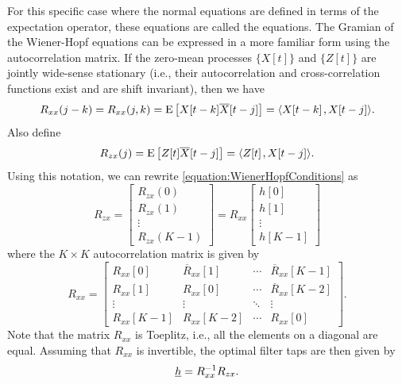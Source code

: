 For this specific case where the normal equations are defined in terms of the expectation operator, these equations are called the  equations.
The Gramian of the Wiener-Hopf equations can be expressed in a more familiar form using the autocorrelation matrix.
If the zero-mean processes $\{X[t]\}$ and $\{Z[t]\}$ are jointly wide-sense stationary (i.e., their autocorrelation and cross-correlation functions exist and are shift invariant), then we have
\begin{equation*}
R_{xx} (j-k) = R_{xx} (j, k) = \mathrm{E} \left[ X[t-k] \overline{X}[t-j] \right]
= {\left\langle  X[t-k]  \mskip2mu ,  X[t-j]  \right\rangle} .
\end{equation*}
Also define
\begin{equation*}
R_{zx}(j) = \mathrm{E} \left[ Z[t] \overline{X}[t-j] \right]
= {\left\langle  Z[t]  \mskip2mu ,  X[t-j]  \right\rangle} .
\end{equation*}
Using this notation, we can rewrite \eqref{equation:WienerHopfConditions} as
\begin{equation*}
R_{zx} = \begin{bmatrix}
R_{zx} (0) \\ R_{zx} (1) \\ \vdots \\ R_{zx} (K-1) \end{bmatrix}
= R_{xx}
\begin{bmatrix}
h [0] \\
h [1] \\ \vdots \\
h [K-1] \end{bmatrix}
\end{equation*}
where the $K \times K$ autocorrelation matrix is given by
\begin{equation*}
R_{xx} = \begin{bmatrix}
R_{xx} [0] & \overline{R}_{xx}[1] & \cdots & \overline{R}_{xx}[K-1] \\
R_{xx} [1] & R_{xx}[0] & \cdots & \overline{R}_{xx}[K-2] \\
\vdots & \vdots & \ddots & \vdots \\
R_{xx} [K-1] & R_{xx}[K-2] & \cdots & R_{xx}[0]
\end{bmatrix} .
\end{equation*}
Note that the matrix $R_{xx}$ is Toeplitz, i.e., all the elements on a diagonal are equal.
Assuming that $R_{xx}$ is invertible, the optimal filter taps are then given by
\begin{equation*}
\underline{h} = R_{xx}^{-1} R_{zx}.
\end{equation*}

